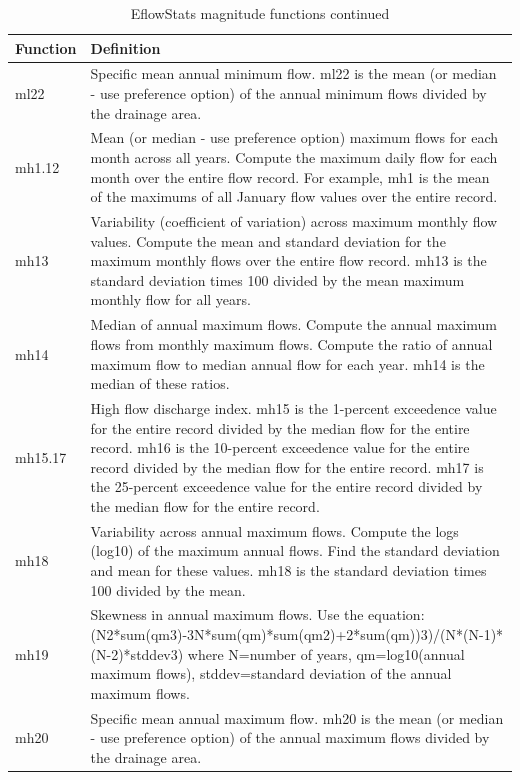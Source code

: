 \documentclass[a4paper,11pt]{article}\usepackage[]{graphicx}\usepackage[]{color}
\begin{document}
\begin{table}[ht]
  \centering
  \begin{threeparttable}[b]
  \caption{EflowStats magnitude functions continued}
  \label{tab:mag3Stats}
  \begin{tabularx}{\textwidth}{|l|X|}
  \hline
\textbf{Function} & \textbf{Definition} \\ 
  \hline
  ml22 & Specific mean annual minimum flow. ml22 is the mean (or median - use preference option) of the annual minimum flows divided by the drainage area. \\
  mh1.12 & Mean (or median - use preference option) maximum flows for each month across all years. Compute the maximum daily flow for each month over the entire flow record. For example, mh1 is the mean of the maximums of all January flow values over the entire record. \\
  mh13 & Variability (coefficient of variation) across maximum monthly flow values. Compute the mean and standard deviation for the maximum monthly flows over the entire flow record. mh13 is the standard deviation times 100 divided by the mean maximum monthly flow for all years. \\
  mh14 & Median of annual maximum flows. Compute the annual maximum flows from monthly maximum flows. Compute the ratio of annual maximum flow to median annual flow for each year. mh14 is the median of these ratios. \\
  mh15.17 & High flow discharge index. mh15 is the 1-percent exceedence value for the entire record divided by the median flow for the entire record. mh16 is the 10-percent exceedence value for the entire record divided by the median flow for the entire record. mh17 is the 25-percent exceedence value for the entire record divided by the median flow for the entire record. \\
  mh18 & Variability across annual maximum flows. Compute the logs (log10) of the maximum annual flows. Find the standard deviation and mean for these values. mh18 is the standard deviation times 100 divided by the mean. \\
  mh19 & Skewness in annual maximum flows. Use the equation: (N2*sum(qm3)-3N*sum(qm)*sum(qm2)+2*sum(qm))3)/(N*(N-1)*(N-2)*stddev3) where N=number of years, qm=log10(annual maximum flows), stddev=standard deviation of the annual maximum flows. \\
  mh20 & Specific mean annual maximum flow. mh20 is the mean (or median - use preference option) of the annual maximum flows divided by the drainage area. \\

\end{tabularx}
\end{threeparttable}
\end{table}
\end{document}
